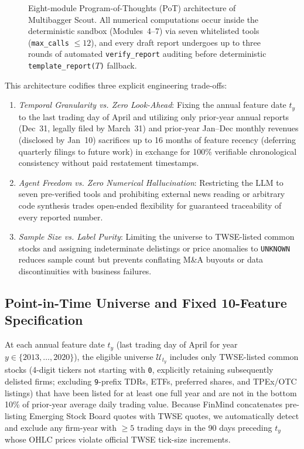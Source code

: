 \documentclass[conference]{IEEEtran}
\begin{document}
\begin{figure}[t]
\centering
\resizebox{\textwidth}{!}{}
\caption{Eight-module Program-of-Thoughts (PoT) architecture of Multibagger Scout. All numerical computations occur inside the deterministic sandbox (Modules~4--7) via seven whitelisted tools (\texttt{max\_calls} $\le 12$), and every draft report undergoes up to three rounds of automated \texttt{verify\_report} auditing before deterministic \texttt{template\_report($T$)} fallback.}
\label{fig:architecture}
\end{figure}

This architecture codifies three explicit engineering trade-offs:
\begin{enumerate}
    \item \emph{Temporal Granularity vs. Zero Look-Ahead}: Fixing the annual feature date $t_y$ to the last trading day of April and utilizing only prior-year annual reports (Dec~31, legally filed by March~31) and prior-year Jan--Dec monthly revenues (disclosed by Jan~10) sacrifices up to 16 months of feature recency (deferring quarterly filings to future work) in exchange for 100\% verifiable chronological consistency without paid restatement timestamps.
    \item \emph{Agent Freedom vs. Zero Numerical Hallucination}: Restricting the LLM to seven pre-verified tools and prohibiting external news reading or arbitrary code synthesis trades open-ended flexibility for guaranteed traceability of every reported number.
    \item \emph{Sample Size vs. Label Purity}: Limiting the universe to TWSE-listed common stocks and assigning indeterminate delistings or price anomalies to \texttt{UNKNOWN} reduces sample count but prevents conflating M\&A buyouts or data discontinuities with business failures.
\end{enumerate}

\subsection{Point-in-Time Universe and Fixed 10-Feature Specification}
At each annual feature date $t_y$ (last trading day of April for year $y \in \{2013,\dots,2020\}$), the eligible universe $\mathcal{U}_{t_y}$ includes only TWSE-listed common stocks (4-digit tickers not starting with \texttt{0}, explicitly retaining subsequently delisted firms; excluding \texttt{9}-prefix TDRs, ETFs, preferred shares, and TPEx/OTC listings) that have been listed for at least one full year and are not in the bottom 10\% of prior-year average daily trading value. Because FinMind concatenates pre-listing Emerging Stock Board quotes with TWSE quotes, we automatically detect and exclude any firm-year with $\ge 5$ trading days in the 90 days preceding $t_y$ whose OHLC prices violate official TWSE tick-size increments.
\end{document}
